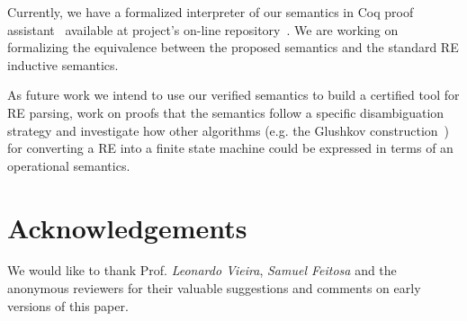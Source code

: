 \documentclass[sigplan]{acmart}
\theoremstyle{definition}
\begin{document}
Currently, we have a formalized interpreter of our semantics in Coq proof assistant~\cite{Bertot2010} available at project's
on-line repository~\cite{regexvm-rep}. We are working on formalizing the equivalence between the proposed semantics and
the standard RE inductive semantics.

As future work we intend to use our verified semantics to build a certified tool for RE
parsing, work on proofs that the semantics follow a specific disambiguation strategy and investigate how other algorithms
(e.g. the Glushkov construction~\cite{Gluskov1961}) for converting a RE into a finite state machine could be expressed in
terms of an operational semantics.

\vspace{-2.0ex}

\section*{Acknowledgements}

We would like to thank Prof. \emph{Leonardo Vieira}, \emph{Samuel Feitosa} and the anonymous reviewers for their valuable
suggestions and comments on early versions of this paper.

\vspace{-2.0ex}




\end{document}
